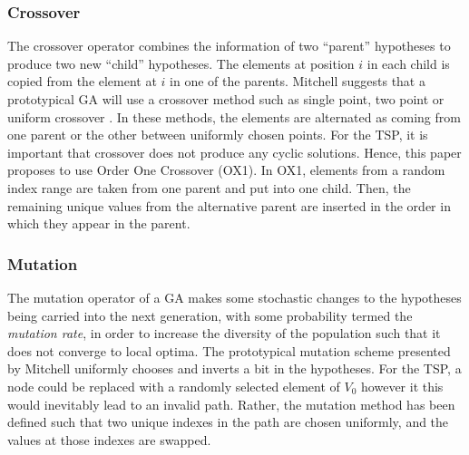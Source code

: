 \documentclass[
	a4paper, %
	10pt, %
	unnumberedsections, %
	twoside, %
]{LTJournalArticle}
\begin{document}
\subsubsection{Crossover} 
The crossover operator combines the information of two ``parent'' hypotheses to produce two new ``child'' hypotheses. The elements at position \(i\) in each child is copied from the element at \(i\) in one of the parents. Mitchell suggests that a prototypical GA will use a crossover method such as single point, two point  or uniform crossover \cite{mitchell:97}. In these methods, the elements are alternated as coming from one parent or the other between uniformly chosen points. For the TSP, it is important that crossover does not produce any cyclic solutions. Hence, this paper proposes to use Order One Crossover (OX1). In OX1, elements from a random index range are taken from one parent and put into one child. Then, the remaining unique values from the alternative parent are inserted in the order in which they appear in the parent. 

\subsubsection{Mutation} 
The mutation operator of a GA makes some stochastic changes to the hypotheses being carried into the next generation, with some probability termed the \emph{mutation rate}, in order to increase the diversity of the population such that it does not converge to local optima. The prototypical mutation scheme presented by Mitchell uniformly chooses and inverts a bit in the hypotheses. For the TSP, a node could be replaced with a randomly selected element of \(V_{0}\) however it this would inevitably lead to an invalid path. Rather, the mutation method has been defined such that two unique indexes in the path are chosen uniformly, and the values at those indexes are swapped. \\
\end{document}
